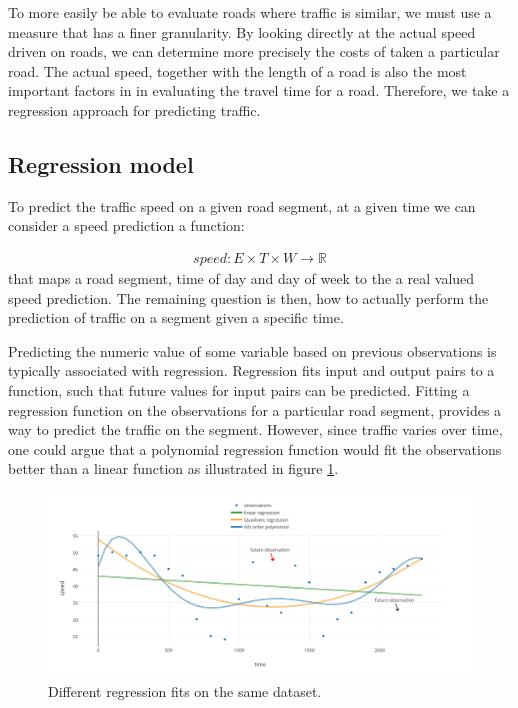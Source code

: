 To more easily be able to evaluate roads where traffic is similar, we must use a measure that has a finer granularity. By looking directly at the actual speed driven on roads, we can determine more precisely the costs of taken a particular road. The actual speed, together with the length of a road is also the most important factors in in evaluating the travel time for a road. Therefore, we take a regression approach for predicting traffic.
\subsection{Regression model}\label{patterns:regression-model}
To predict the traffic speed on a given road segment, at a given time we can consider a speed prediction a function:

\begin{align}\label{eq:speed}
speed: E \times T \times W \rightarrow \mathbb{R}
\end{align}
that maps a road segment, time of day and day of week to the a real valued speed prediction. The remaining question is then, how to actually perform the prediction of traffic on a segment given a specific time. \par
Predicting the numeric value of some variable based on previous observations is typically associated with regression. Regression fits input and output pairs to a function, such that future values for input pairs can be predicted. Fitting a regression function on the observations for a particular road segment, provides a way to predict the traffic on the segment. However, since traffic varies over time, one could argue that a polynomial regression function would fit the observations better than a linear function as illustrated in figure \ref{fig:compare-regression}.
\begin{figure}
\includegraphics[width=\textwidth]{figures/compare-regression.pdf}
\caption{Different regression fits on the same dataset.}
\label{fig:compare-regression}
\end{figure}

